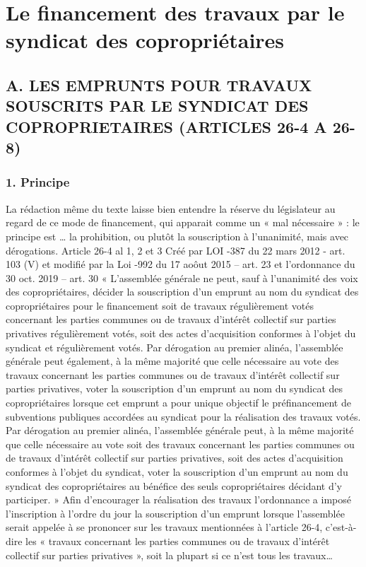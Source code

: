 \section{Le financement des travaux par le syndicat des copropriétaires}

	\subsection{A. LES EMPRUNTS POUR TRAVAUX SOUSCRITS PAR LE SYNDICAT DES COPROPRIETAIRES (ARTICLES 26-4 A 26-8)}
	
		\subsubsection{1. Principe}
		
			La rédaction même du texte laisse bien entendre la réserve du législateur au regard de ce mode de financement, qui apparait comme un « mal nécessaire » : le principe est … la prohibition, ou plutôt la souscription à l’unanimité, mais avec dérogations.
			Article 26-4 al 1, 2 et 3 Créé par LOI -387 du 22 mars 2012 - art. 103 (V) et modifié par la Loi -992 du 17 aoôut 2015 – art. 23 et l’ordonnance du 30 oct. 2019 – art. 30
			« L'assemblée générale ne peut, sauf à l'unanimité des voix des copropriétaires, décider la souscription d'un emprunt au nom du syndicat des copropriétaires pour le financement soit de travaux régulièrement votés concernant les parties communes ou de travaux d'intérêt collectif sur parties privatives régulièrement votés, soit des actes d'acquisition conformes à l'objet du syndicat et régulièrement votés.
			Par dérogation au premier alinéa, l'assemblée générale peut également, à la même majorité que celle nécessaire au vote des travaux concernant les parties communes ou de travaux d'intérêt collectif sur parties privatives, voter la souscription d'un emprunt au nom du syndicat des copropriétaires lorsque cet emprunt a pour unique objectif le préfinancement de subventions publiques accordées au syndicat pour la réalisation des travaux votés.
			Par dérogation au premier alinéa, l'assemblée générale peut, à la même majorité que celle nécessaire au vote soit des travaux concernant les parties communes ou de travaux d'intérêt collectif sur parties privatives, soit des actes d'acquisition conformes à l'objet du syndicat, voter la souscription d'un emprunt au nom du syndicat des copropriétaires au bénéfice des seuls copropriétaires décidant d'y participer. »
			Afin d’encourager la réalisation des travaux l’ordonnance a imposé l’inscription à l’ordre du jour la souscription d’un emprunt lorsque l’assemblée serait appelée à se prononcer sur les travaux mentionnées à l’article 26-4, c’est-à-dire les « travaux concernant les parties communes ou de travaux d'intérêt collectif sur parties privatives », soit la plupart si ce n’est tous les travaux…
